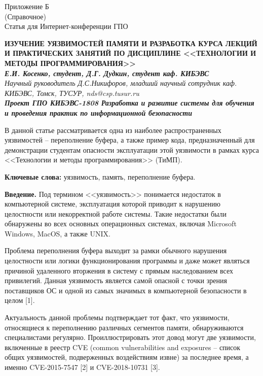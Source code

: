 \begin{center}
Приложение Б\\
(Справочное)\\
Статья для Интернет-конференции ГПО
\end{center}
\vspace{\baselineskip}

\begin{center}
\textbf{ИЗУЧЕНИЕ УЯЗВИМОСТЕЙ ПАМЯТИ И РАЗРАБОТКА КУРСА ЛЕКЦИЙ И ПРАКТИЧЕСКИХ ЗАНЯТИЙ ПО ДИСЦИПЛИНЕ <<ТЕХНОЛОГИИ И МЕТОДЫ ПРОГРАММИРОВАНИЯ>>}\\
\textbf{\textit{Е.И. Косенко, студент, Д.Г. Дудкин, студент каф. КИБЭВС}}\\
\textit{Научный руководитель Д.С.Никифоров, младший научный сотрудник каф. КИБЭВС, Томск, ТУСУР, nds@csp.tusur.ru}\\
\textbf{\textit{Проект ГПО КИБЭВС-1808 Разработка и развитие системы для обучения и проведения практик по информационной безопасности}}\\  
\end{center}
В данной статье рассматривается одна из наиболее распространенных уязвимостей -- переполнение буфера, а также пример кода, предназначенный для демонстрации студентам опасности эксплуатации этой уязвимости в рамках курса <<Технологии и методы программирования>> (ТиМП).\par
\textbf{Ключевые слова:} уязвимость, память, переполнение буфера.\par
\textbf{Введение.} Под термином <<уязвимость>> понимается недостаток в компьютерной системе, эксплуатация которой приводит к нарушению целостности или некорректной работе системы. Такие недостатки были обнаружены во всех основных операционных системах, включая Microsoft Windows, MacOS, а также UNIX.\par 
Проблема переполнения буфера выходит за рамки обычного нарушения целостности или логики функционирования программы и даже может являться причиной удаленного вторжения в систему с прямым наследованием всех привилегий. Данная уязвимость является самой опасной с точки зрения поставщиков ОС и одной из самых значимых в компьютерной безопасности в целом [1].\par 
Актуальность данной проблемы подтверждает тот факт, что уязвимости, относящиеся к переполнению различных сегментов памяти, обнаруживаются специалистами регулярно. Проиллюстрировать этот довод могут две уязвимости, включенные в реестр CVE (common vulnerabilities and exposures -- список общих уязвимостей, подверженных воздействиям извне) за последнее время, а именно CVE-2015-7547 [2] и CVE-2018-10731 [3].\par
